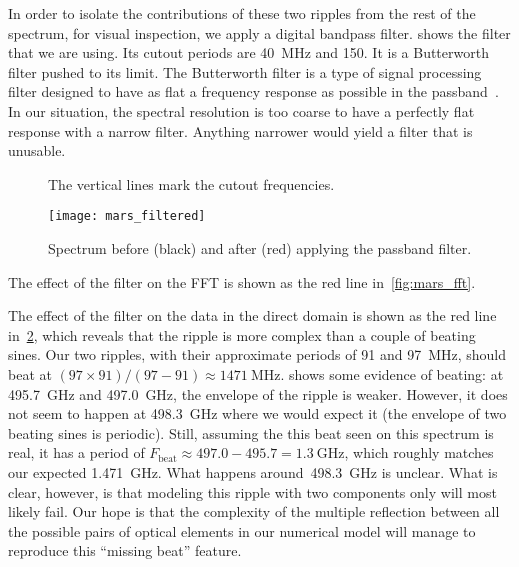 In order to isolate the contributions of these two ripples from the rest of the spectrum, for visual inspection, we apply a digital bandpass filter.
 shows the filter that we are using.
Its cutout periods are \SI{40}{\mega\hertz} and \SI{150}{\megahertz}.
It is a Butterworth filter pushed to its limit.
The Butterworth filter is a type of signal processing filter designed to have as flat a frequency response as possible in the passband~\cite{butterworth1930theory}.
In our situation, the spectral resolution is too coarse to have a perfectly flat response with a narrow filter.
Anything narrower would yield a filter that is unusable.
\begin{figure}[hbtp]
    \centering
    \caption{Transfer function of a Butterworth passband filter between 40 and~\SI{150}{\mega\hertz} for a sampling period of \SI{0.5}{\mega\hertz}.}
    \caption*{The vertical lines mark the cutout frequencies.}
    \label{fig:mars_filter}
\end{figure}

\begin{figure}[hbtp]
    \centering
    \texttt{[image: mars\_filtered]}
    \caption{Spectrum before (black) and after (red) applying the passband filter.}
    \label{fig:mars_filtered}
\end{figure}

The effect of the filter on the FFT is shown as the red line in~\cref{fig:mars_fft}.

The effect of the filter on the data in the direct domain is shown as the red line in~\cref{fig:mars_filtered},
which reveals that the ripple is more complex than a couple of beating sines.
Our two ripples, with their approximate periods of \num{91} and \SI{97}{\mega\hertz}, should beat at $(97 \times 91)/(97 - 91) \approx \SI{1471}{\mega\hertz}$.
 shows some evidence of beating: at \SI{495.7}{\giga\hertz} and \SI{497.0}{\giga\hertz}, the envelope of the ripple is weaker.
However, it does not seem to happen at \SI{498.3}{\giga\hertz} where we would expect it (the envelope of two beating sines is periodic).
Still, assuming the this beat seen on this spectrum is real, it has a period of $F_\text{beat}\approx 497.0 - 495.7 = \SI{1.3}{\giga\hertz}$, which roughly matches our expected \SI{1.471}{\giga\hertz}.
What happens around~\SI{498.3}{\giga\hertz} is unclear.
What is clear, however, is that modeling this ripple with two components only will most likely fail.
Our hope is that the complexity of the multiple reflection between all the possible pairs of optical elements in our numerical model will manage to reproduce this ``missing beat'' feature.

